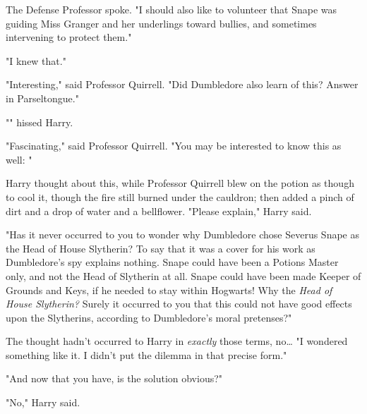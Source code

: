 The Defense Professor spoke. "I should also like to volunteer that Snape was
guiding Miss Granger and her underlings toward bullies, and sometimes
intervening to protect them."

"I knew that."

"Interesting," said Professor Quirrell. "Did Dumbledore also learn of this?
Answer in Parseltongue."

"" hissed Harry.

"Fascinating," said Professor Quirrell. "You may be interested to know this as
well: "

Harry thought about this, while Professor Quirrell blew on the potion as though
to cool it, though the fire still burned under the cauldron; then added a pinch
of dirt and a drop of water and a bellflower. "Please explain," Harry said.

"Has it never occurred to you to wonder why Dumbledore chose Severus Snape as
the Head of House Slytherin? To say that it was a cover for his work as
Dumbledore's spy explains nothing. Snape could have been a Potions Master only,
and not the Head of Slytherin at all. Snape could have been made Keeper of
Grounds and Keys, if he needed to stay within Hogwarts! Why the \emph{Head of
House Slytherin?} Surely it occurred to you that this could not have good
effects upon the Slytherins, according to Dumbledore's moral pretenses?"

The thought hadn't occurred to Harry in \emph{exactly} those terms, no{\ldots}
"I wondered something like it. I didn't put the dilemma in that precise form."

"And now that you have, is the solution obvious?"

"No," Harry said.

